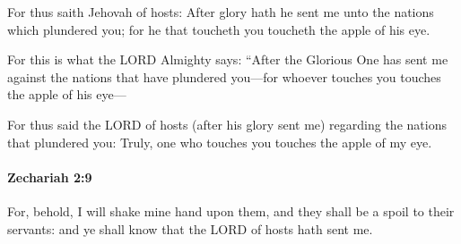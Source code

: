 			\begin{versebox}
					\item[BHS] 
					\item[LXX] 
					\item[ASV] For thus saith Jehovah of hosts: After glory hath he sent me unto the nations which plundered you; for he that toucheth you toucheth the apple of his eye.
					\item[NIV] For this is what the LORD Almighty says: “After the Glorious One has sent me against the nations that have plundered you—for whoever touches you touches the apple of his eye—
					\item[NRSV] For thus said the LORD of hosts (after his glory sent me) regarding the nations that plundered you: Truly, one who touches you touches the apple of my eye.
			\end{versebox}

		\paragraph{Zechariah 2:9} %
			\label{ZECHARIAH-2-9}

			For, behold, I will shake mine hand upon them, and they shall be a spoil to their servants: and ye shall know that the LORD of hosts hath sent me.

